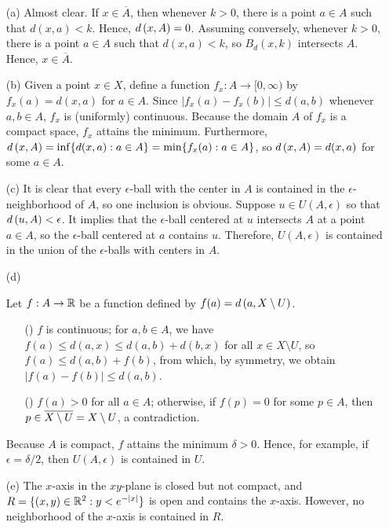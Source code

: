 \begin{sol}
    \begin{enumerate}
        \item[(a)]
        {    
            Almost clear.
            If $x\in\overline{A}$, then whenever $k>0$, there is a point $a\in A$ such that $d(x, a)<k$.
            Hence, ${d}\left({x},{A}\right)=0$.
            Assuming conversely, whenever $k>0$, there is a point $a\in A$ such that $d(x, a)<k$, so $B_d(x, k)$ intersects $A$.
            Hence, $x\in\overline{A}$.
        }
        \item[(b)]
        {
            Given a point $x\in X$, define a function $f_x: A\rightarrow[0, \infty)$ by $f_x(a)=d(x, a)$ for $a\in A$.
            Since $|f_x(a)-f_x(b)|\leq d(a, b)$ whenever $a, b\in A$, $f_x$ is (uniformly) continuous.
            Because the domain $A$ of $f_x$ is a compact space, $f_x$ attains the minimum.
            Furthermore, ${d}\left({x},{A}\right)=\inf\{d(x, a): a\in A\}=\min\{f_x(a): a\in A\}$, so ${d}\left({x},{A}\right)=d(x, a)$ for some $a\in A$.
        }
        \item[(c)]
        {
            It is clear that every $\epsilon$-ball with the center in $A$ is contained in the $\epsilon$-neighborhood of $A$, so one inclusion is obvious.
            Suppose $u\in U(A, \epsilon)$ so that ${d}\left({u},{A}\right)<\epsilon$.
            It implies that the $\epsilon$-ball centered at $u$ intersects $A$ at a point $a\in A$, so the $\epsilon$-ball centered at $a$ contains $u$.
            Therefore, $U(A, \epsilon)$ is contained in the union of the $\epsilon$-balls with centers in $A$.
        }
        \item[(d)]
        {    
            Let $f: A\rightarrow {\mathbb{R}}$ be a function defined by $f(a)={d}\left({a},{X\setminus U}\right)$.
            \begin{enumerate}
                \item[(\romannumeral 1)]
                {
                    $f$ is continuous; for $a, b\in A$, we have $f(a)\leq d(a, x)\leq d(a, b)+d(b, x)$ for all $x\in X\setminus U$, so $f(a)\leq d(a, b)+f(b)$, from which, by symmetry, we obtain $|f(a)-f(b)|\leq d(a, b)$.
                }
                \item[(\romannumeral 2)]
                {
                    $f(a)>0$ for all $a\in A$; otherwise, if $f(p)=0$ for some $p\in A$, then $p\in\overline{X\setminus U}=X\setminus U$, a contradiction.
                }
            \end{enumerate}
            Because $A$ is compact, $f$ attains the minimum $\delta>0$.
            Hence, for example, if $\epsilon=\delta/2$, then $U(A, \epsilon)$ is contained in $U$.
        }
        \item[(e)]
        {
            The $x$-axis in the $xy$-plane is closed but not compact, and $R=\{(x, y)\in{\mathbb{R}}^2: y<e^{-|x|}\}$ is open and contains the $x$-axis.
            However, no neighborhood of the $x$-axis is contained in $R$.
        }
    \end{enumerate}
\end{sol}

